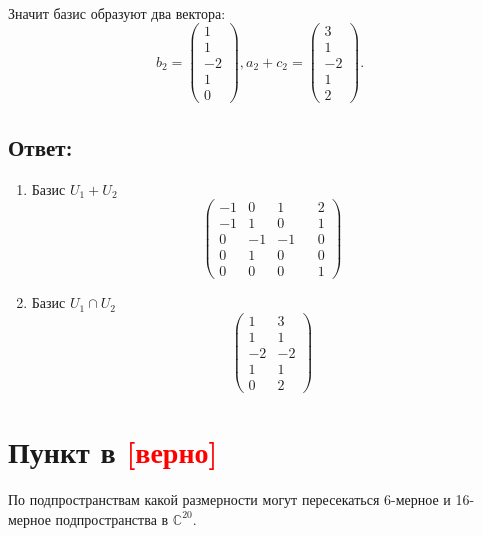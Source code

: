 \documentclass[12pt]{article}
\begin{document}
\begin{enumerate}
\begin{gather*}
        \end{gather*}
        Значит базис образуют два вектора:
        \[
            b_2 =
            \begin{pmatrix}
                1 \\ 1 \\ -2 \\ 1 \\ 0
            \end{pmatrix} ,
            a_2 + c_2 =
            \begin{pmatrix}
                3 \\ 1 \\ -2 \\ 1 \\ 2
            \end{pmatrix} .
        \]
    \end{enumerate}

    \subsection*{Ответ:}
    \begin{enumerate}
        \item
        Базис $U_1 + U_2$
        \[
            \begin{pmatrix}
                -1 & 0  & 1  & & 2 \\
                -1 & 1  & 0  & & 1 \\
                0  & -1 & -1 & & 0 \\
                0  & 1  & 0  & & 0 \\
                0  & 0  & 0  & & 1
            \end{pmatrix}
        \]
        \item
        Базис $U_1 \cap U_2$
        \[
            \begin{pmatrix}
                1  & 3  \\
                1  & 1  \\
                -2 & -2 \\
                1  & 1  \\
                0  & 2
            \end{pmatrix}
        \]
    \end{enumerate}

    \section*{Пункт в \textcolor{red}{[верно]}}
    По подпространствам какой размерности могут пересекаться 6-мерное и 16-мерное подпространства в $\mathbb{C}^{20}$.
\end{document}
